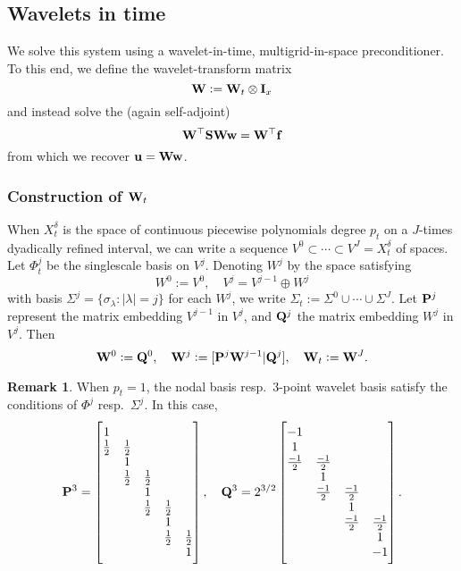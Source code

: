 \documentclass[11pt,a4paper]{amsart}
\theoremstyle{definition}
\newtheorem*{remark}{Remark}
\newcommand{\kron}{\otimes}
\begin{document}
\subsection*{Wavelets in time}
We solve this system using a wavelet-in-time, multigrid-in-space preconditioner. To this end, we
define the wavelet-transform matrix
\[
  {\bf W} := {\bf W}_t \kron {\bf I}_x
\]
and instead solve the (again self-adjoint)
\begin{equation}
  {\bf W}^\top {\bf S} {\bf W} {\bf w} = {\bf W}^\top {\bf f}
  \label{eqn:wit-mat}
\end{equation}
from which we recover ${\bf u} = {\bf W} {\bf w}$.

\subsubsection*{Construction of ${\bf W}_t$}
When $X^\delta_t$ is the space of continuous piecewise polynomials degree $p_t$ on a $J$-times dyadically refined interval,
we can write a sequence $V^0 \subset \cdots \subset V^J = X^\delta_t$ of spaces.
Let $\Phi^j_t$ be the singlescale basis on $V^j$. Denoting $W^j$ by the space satisfying
\[
  W^0 := V^0, \quad V^j = V^{j-1} \oplus W^j
\]
with basis $\Sigma^j = \{\sigma_\lambda : |\lambda| = j \}$ for each $W^j$, we write $\Sigma_t := \Sigma^0 \cup \cdots \cup \Sigma^J$.
Let ${\bf P}^j$ represent the matrix embedding $V^{j-1}$ in $V^j$, and ${\bf Q}^j$
the matrix embedding $W^j$ in $V^j$. Then
\[
  {\bf W}^0 := {\bf Q}^0, \quad {\bf W}^j := [{\bf P}^j {\bf W}^{j-1} | {\bf Q}^j], \quad {\bf W}_t := {\bf W}^J.
\]
\begin{remark}
  When $p_t = 1$, the nodal basis resp.~3-point wavelet basis satisfy the conditions of $\Phi^j$ resp.~$\Sigma^j$.
  In this case,
\[
  {\bf P}^3 = \begin{bmatrix}1 \\ 1\over2 & 1\over2 \\ & 1  \\ & 1\over2 & 1\over2 \\ &&1 \\ &&1\over2 & 1\over2 \\ &&&1 \\ &&& 1\over2 & 1\over2 \\ &&&&1\end{bmatrix}, \quad {\bf Q}^3 = 2^{3/2} \begin{bmatrix} -1 \\ 1 \\ -1\over2 & -1\over2 \\ &1 \\ &-1\over2 & -1\over2 \\ &&1 \\ &&-1\over2 & -1\over2 \\ &&&1 \\ &&&-1\end{bmatrix}.
\]
\end{remark}
\end{document}
